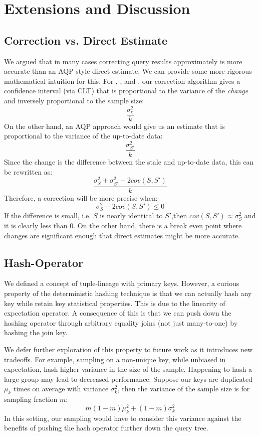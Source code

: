 
\section{Extensions and Discussion}\label{sec:ext}
\subsection{Correction vs. Direct Estimate}
We argued that in many cases correcting query results approximately is more accurate than an
AQP-style direct estimate. 
We can provide some more rigorous mathematical intuition for this.
For \sumfunc, \countfunc, and \avgfunc, our correction algorithm gives a confidence interval (via CLT) that is
proportional to the variance of the \emph{change} and inversely proportional to the sample size:
\[\frac{\sigma_{c}^2}{k}\]
On the other hand, an AQP approach would give us an estimate that is proportional to the variance of the up-to-date data:
\[\frac{\sigma_{S'}^2}{k}\]
Since the change is the difference between the stale and up-to-date data, this can be rewritten as: 
\[\frac{\sigma_{S}^2 + \sigma_{S'}^2 - 2cov(S,S')}{k}\]
Therefore, a correction will be more precise when:
\[\sigma_{S}^2 - 2cov(S,S') \le 0 \]
If the difference is small, i.e. $S$ is nearly identical to $S'$,then $cov(S,S') \approx \sigma_{S}^2$ and it is clearly less than 0. 
On the other hand, there is a break even point where changes are significant enough that direct estimates might be more accurate.

\subsection{Hash-Operator}
We defined a concept of tuple-lineage with primary keys.
However, a curious property of the deterministic hashing technique is that we can actually hash any key while retain key
statistical properties.
This is due to the linearity of expectation operator. 
A consequence of this is that we can push down the hashing operator through arbitrary equality joins (not just many-to-one) by hashing the join key.

We defer further exploration of this property to future work as it introduces new tradeoffs.
For example, sampling on a non-unique key, while unbiased in expectation, hash higher variance in the size of the sample.
Happening to hash a large group may lead to decreased performance. 
Suppose our keys are duplicated $\mu_k$ times on average with variance $\sigma_k^2$, then the variance of the
sample size is for sampling fraction $m$:
\[m(1-m)\mu_k^2+(1-m)\sigma_k^2\] 
In this setting, our sampling would have to consider this variance against the benefits of pushing the hash operator further down the query tree. 

